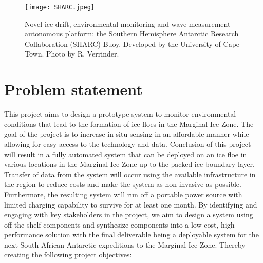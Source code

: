 \begin{figure}[H]
    \centering
    \texttt{[image: SHARC.jpeg]}
    \caption{Novel ice drift, environmental monitoring and wave measurement autonomous platform: the Southern Hemisphere Antarctic Research Collaboration (SHARC) Buoy. Developed by the University of Cape Town. Photo by R. Verrinder.}
    \label{fig:chapter1_sharc_buoy}
\end{figure}


\section{Problem statement}
\label{subsec:ch1.section2}

This project aims to design a prototype system to monitor environmental conditions that lead to the formation of ice floes in the Marginal Ice Zone. The goal of the project is to increase in situ sensing in an affordable manner while allowing for easy access to the technology and data. Conclusion of this project will result in a fully automated system that can be deployed on an ice floe in various locations in the Marginal Ice Zone up to the packed ice boundary layer. Transfer of data from the system will occur using the available infrastructure in the region to reduce costs and make the system as non-invasive as possible. Furthermore, the resulting system will run off a portable power source with limited charging capability to survive for at least one month. By identifying and engaging with key stakeholders in the project, we aim to design a system using off-the-shelf components and synthesize components into a low-cost, high-performance solution with the final deliverable being a deployable system for the next South African Antarctic expeditions to the Marginal Ice Zone. Thereby creating the following project objectives:
